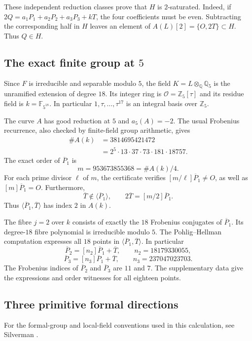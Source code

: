 \documentclass[11pt,a4paper]{article}
\theoremstyle{definition}\newtheorem{definition}[theorem]{Definition}
\theoremstyle{remark}\newtheorem{remark}[theorem]{Remark}
\newcommand{\Q}{\mathbb Q}\newcommand{\Z}{\mathbb Z}\newcommand{\F}{\mathbb F}
\newcommand{\OO}{\mathcal O}\newcommand{\Cl}{\operatorname{Cl}}
\begin{document}
These independent reduction classes prove that $H$ is $2$-saturated. Indeed, if $2Q=a_1P_1+a_2P_2+a_3P_3+kT$, the four coefficients must be even. Subtracting the corresponding half in $H$ leaves an element of $A(L)[2]=\{O,2T\}\subset H$. Thus $Q\in H$.

\subsection{The exact finite group at $5$}

Since $F$ is irreducible and separable modulo $5$, the field
$K=L\otimes_{\Q}\Q_5$ is the unramified extension of degree $18$.
Its integer ring is $\OO=\Z_5[\tau]$ and its residue field is
$k=\F_{5^{18}}$. In particular $1,\tau,\ldots,\tau^{17}$ is an
integral basis over $\Z_5$.

The curve $A$ has good reduction at $5$ and $a_5(A)=-2$. The usual
Frobenius recurrence, also checked by finite-field group arithmetic, gives
\begin{align*}
\#A(k)&=3814695421472\\
&=2^5\cdot13\cdot37\cdot73\cdot181\cdot18757.
\end{align*}
The exact order of $\overline P_1$ is
\[
m=953673855368=\#A(k)/4.
\]
For each prime divisor $\ell$ of $m$, the certificate verifies
$[m/\ell]\overline P_1\ne O$, as well as $[m]\overline P_1=O$.
Furthermore,
\[
\overline T\notin\langle\overline P_1\rangle,
\qquad 2\overline T=[m/2]\overline P_1.
\]
Thus $\langle\overline P_1,\overline T\rangle$ has index $2$ in $A(k)$.

The fibre $j=2$ over $k$ consists of exactly the $18$ Frobenius conjugates
of $\overline P_1$. Its degree-$18$ fibre polynomial is irreducible
modulo $5$. The Pohlig--Hellman computation expresses all $18$ points in $\langle\overline P_1,\overline T\rangle$. In particular
\[
\overline P_2=[n_2]\overline P_1+\overline T,
\qquad n_2=18179330055,
\]
\[
\overline P_3=[n_3]\overline P_1+\overline T,
\qquad n_3=237047023703.
\]
The Frobenius indices of $\overline P_2$ and $\overline P_3$ are $11$
and $7$. The supplementary data give the expressions and order witnesses for all eighteen points.

\subsection{Three primitive formal directions}

For the formal-group and local-field conventions used in this calculation, see Silverman \cite{SilvermanAdvanced,Silverman}.
\end{document}
